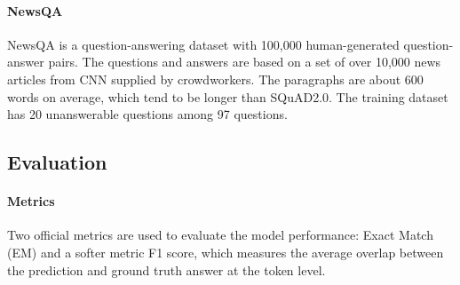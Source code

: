 \documentclass[letterpaper]{article} \usepackage{aaai21}  \usepackage{times}  \usepackage{helvet} \usepackage{courier}  \usepackage[hyphens]{url}  \usepackage{graphicx}
\begin{document}
\paragraph{NewsQA}
NewsQA 
\cite{trischler2017newsqa} is a question-answering dataset with 100,000 human-generated question-answer pairs. The questions and answers are based on a set of over 10,000 news articles from CNN supplied by crowdworkers. The paragraphs are about 600 words on average, which tend to be longer than SQuAD2.0. The training dataset has
20 unanswerable questions among 97 questions.










\subsection{Evaluation}

\paragraph{Metrics} Two official metrics are used to evaluate the model performance: Exact Match (EM) and a softer metric F1 score, which measures the average overlap between the prediction and ground truth answer at the token level. 
\end{document}
